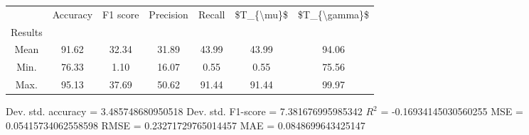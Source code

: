 \begin{tabular}{|c|c|c|c|c|c|c|}
\toprule
{} &  Accuracy &  F1 score &  Precision &  Recall &  \$T\_\{\textbackslash mu\}\$ &  \$T\_\{\textbackslash gamma\}\$ \\
Results &           &           &            &         &            &               \\
\hline
Mean    &     91.62 &     32.34 &      31.89 &   43.99 &      43.99 &         94.06 \\
Min.    &     76.33 &      1.10 &      16.07 &    0.55 &       0.55 &         75.56 \\
Max.    &     95.13 &     37.69 &      50.62 &   91.44 &      91.44 &         99.97 \\
\bottomrule
\end{tabular}

 Dev. std. accuracy = 3.485748680950518
 Dev. std. F1-score = 7.381676995985342
 $R^2$ = -0.16934145030560255
 MSE = 0.05415734062558598
 RMSE = 0.23271729765014457
 MAE = 0.0848699643425147